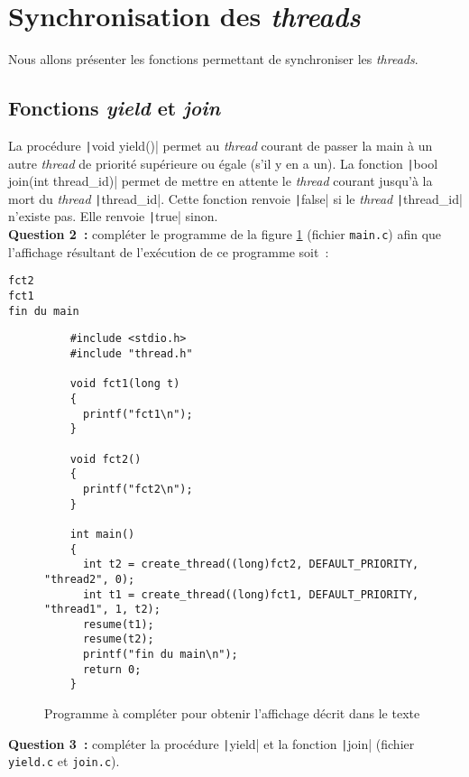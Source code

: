 \documentclass[a4paper]{article}
\begin{document}
\section{Synchronisation des \emph{threads}}

Nous allons présenter les fonctions permettant de synchroniser les \emph{threads}.

\subsection{Fonctions \emph{yield} et \emph{join}}

La procédure \texttt|void yield()| permet au \emph{thread} courant de passer la main à un autre \emph{thread} de priorité supérieure ou égale (s'il y en a un). La
fonction \texttt|bool join(int thread_id)| permet de mettre en attente le \emph{thread} courant jusqu'à la mort du \emph{thread} \texttt|thread_id|. Cette
fonction renvoie \texttt|false| si le \emph{thread} \texttt|thread_id| n'existe pas. Elle renvoie \texttt|true| sinon.\\

\textbf{Question 2~:} compléter le programme de la figure \ref{fig:prog2} (fichier \verb+main.c+) afin que l'affichage résultant de l'exécution de ce programme soit~:
\begin{verbatim}
fct2
fct1
fin du main
\end{verbatim}

\begin{figure}[!htpb]
\begin{verbatim}
    #include <stdio.h>
    #include "thread.h"

    void fct1(long t)
    {
      printf("fct1\n");
    }

    void fct2()
    {
      printf("fct2\n");
    }

    int main()
    {
      int t2 = create_thread((long)fct2, DEFAULT_PRIORITY, "thread2", 0);
      int t1 = create_thread((long)fct1, DEFAULT_PRIORITY, "thread1", 1, t2);
      resume(t1);
      resume(t2);
      printf("fin du main\n");
      return 0;
    }
\end{verbatim}
\caption{Programme à compléter pour obtenir l'affichage décrit dans le texte}
\label{fig:prog2}
\end{figure}

\textbf{Question 3~:} compléter la procédure \texttt|yield| et la fonction \texttt|join| (fichier \verb+yield.c+ et \verb+join.c+).
\end{document}
